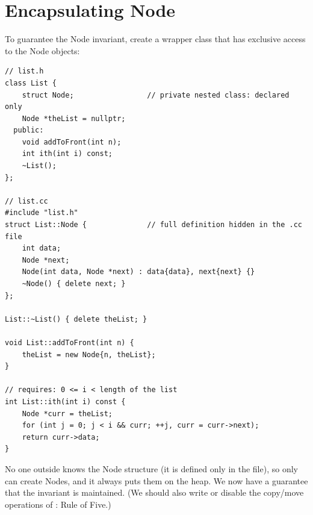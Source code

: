 \section{Encapsulating Node}
To guarantee the Node invariant, create a wrapper class  that has
exclusive access to the Node objects:
\begin{lstlisting}[style=cpp]
// list.h
class List {
    struct Node;                 // private nested class: declared only
    Node *theList = nullptr;
  public:
    void addToFront(int n);
    int ith(int i) const;
    ~List();
};

// list.cc
#include "list.h"
struct List::Node {              // full definition hidden in the .cc file
    int data;
    Node *next;
    Node(int data, Node *next) : data{data}, next{next} {}
    ~Node() { delete next; }
};

List::~List() { delete theList; }

void List::addToFront(int n) {
    theList = new Node{n, theList};
}

// requires: 0 <= i < length of the list
int List::ith(int i) const {
    Node *curr = theList;
    for (int j = 0; j < i && curr; ++j, curr = curr->next);
    return curr->data;
}
\end{lstlisting}
No one outside  knows the Node structure (it is defined only in the
 file), so only  can create Nodes, and it always puts them
on the heap. We now have a guarantee that the invariant is maintained. (We should
also write or disable the copy/move operations of : Rule of Five.)

\begin{center}
\end{center}


